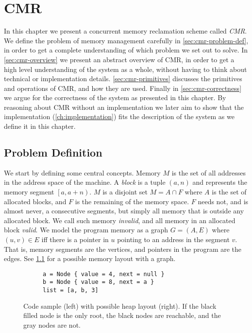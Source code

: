 \chapter{CMR\label{ch:cmr}}

In this chapter we present a concurrent memory reclamation scheme called \emph{CMR}.  We define the
problem of memory management carefully in \cref{sec:cmr-problem-def}, in order to get a complete
understanding of which problem we set out to solve.  In \cref{sec:cmr-overview} we present an
abstract overview of CMR, in order to get a high level understanding of the system as a whole,
without having to think about technical or implementation details.  \cref{sec:cmr-primitives}
discusses the primitives and operations of CMR, and how they are used.  Finally in
\cref{sec:cmr-correctness} we argue for the correctness of the system as presented in this chapter.
By reasoning about CMR without an implementation we later aim to show that the implementation
(\cref{ch:implementation}) fits the description of the system as we define it in this chapter.



\section{Problem Definition\label{sec:cmr-problem-def}}

We start by defining some central concepts. Memory $M$ is the set of all addresses in the address
space of the machine. A \emph{block} is a tuple $(a, n)$ and represents the memory segment
$\left[a, a + n\right)$. $M$ is a disjoint set $M = A \cap F$ where $A$ is the set of
allocated blocks, and $F$ is the remaining of the memory space. $F$ needs not, and is almost never,
a consecutive segments, but simply all memory that is outside any allocated block. We call such
memory \emph{invalid}, and all memory in an allocated block \emph{valid}.  We model the program
memory as a graph $G = (A, E)$ where $(u, v) \in E$ iff there is a pointer in $u$ pointing to an
address in the segment $v$. That is, memory segments are the vertices, and pointers in the program
are the edges. See \cref{fig:memory-graph} for a possible memory layout with a graph.

\begin{figure}[ht]
  \centering
  \begin{subfigure}{0.45\textwidth}
    \begin{lstlisting}
a = Node { value = 4, next = null }
b = Node { value = 8, next = a }
list = [a, b, 3]
    \end{lstlisting}
  \end{subfigure}
  \hfill
  \begin{subfigure}{0.45\textwidth}
    
  \end{subfigure}
  \caption{Code sample (left) with possible heap layout (right). If the black filled node is the
  only root, the black nodes are reachable, and the gray nodes are not.\label{fig:memory-graph}}
\end{figure}


